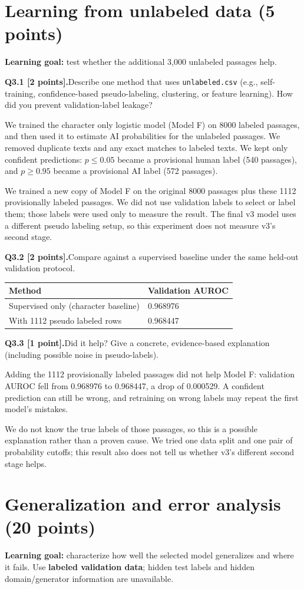 \documentclass[11pt,letterpaper]{article}
\newcommand{\question}[2]{\needspace{4\baselineskip}\par\addvspace{0.45em}\noindent\textbf{#1}\quad #2\par\nobreak\vspace{0.1em}}
\begin{document}
\section{Learning from unlabeled data (5 points)}
\textbf{Learning goal:} test whether the additional 3,000 unlabeled passages help.
\question{Q3.1 [2 points].}{Describe one method that uses \texttt{unlabeled.csv} (e.g., self-training, confidence-based pseudo-labeling, clustering, or feature learning). How did you prevent validation-label leakage?}
We trained the character only logistic model (Model F) on 8000 labeled passages, and then used it to estimate AI probabilities for the unlabeled passages. We removed duplicate texts and any exact matches to labeled texts. We kept only confident predictions: $p\leq0.05$ became a provisional human label (540 passages), and $p\geq0.95$ became a provisional AI label (572 passages).
\newline

We trained a new copy of Model F on the original 8000 passages plus these 1112 provisionally labeled passages. We did not use validation labels to select or label them; those labels were used only to measure the result. The final v3 model uses a different pseudo labeling setup, so this experiment does not measure v3's second stage.
\question{Q3.2 [2 points].}{Compare against a supervised baseline under the same held-out validation protocol.}
\begin{tabularx}{\linewidth}{@{}Yp{1.5in}@{}}\toprule Method & Validation AUROC \\ \midrule Supervised only (character baseline) & 0.968976 \\ With 1112 pseudo labeled rows & 0.968447 \\ \bottomrule\end{tabularx}
\question{Q3.3 [1 point].}{Did it help? Give a concrete, evidence-based explanation (including possible noise in pseudo-labels).}
Adding the 1112 provisionally labeled passages did not help Model F: validation AUROC fell from 0.968976 to 0.968447, a drop of 0.000529. A confident prediction can still be wrong, and retraining on wrong labels may repeat the first model's mistakes.
\newline

We do not know the true labels of those passages, so this is a possible explanation rather than a proven cause. We tried one data split and one pair of probability cutoffs; this result also does not tell us whether v3's different second stage helps.
\newpage
\section{Generalization and error analysis (20 points)}
\textbf{Learning goal:} characterize how well the selected model generalizes and where it fails. Use \textbf{labeled validation data}; hidden test labels and hidden domain/generator information are unavailable.
\end{document}
